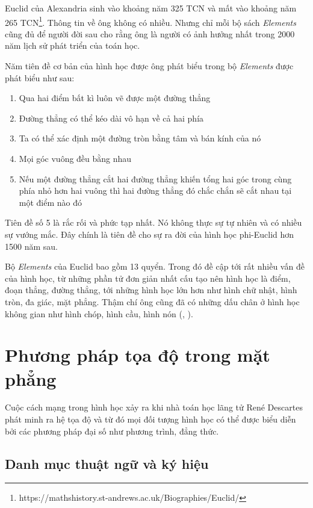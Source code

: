 Euclid của Alexandria sinh vào khoảng năm 325 TCN và mất vào khoảng năm 265 TCN\footnote{https://mathshistory.st-andrews.ac.uk/Biographies/Euclid/}. Thông tin về ông không có nhiều. Nhưng chỉ mỗi bộ sách \textit{Elements} cũng đủ để người đời sau cho rằng ông là người có ảnh hưởng nhất trong 2000 năm lịch sử phát triển của toán học.

Năm tiên đề cơ bản của hình học được ông phát biểu trong bộ \textit{Elements} được phát biểu như sau:

\begin{enumerate}
	\item Qua hai điểm bất kì luôn vẽ được một đường thẳng
	\item Đường thẳng có thể kéo dài vô hạn về cả hai phía
	\item Ta có thể xác định một đường tròn bằng tâm và bán kính của nó
	\item Mọi góc vuông đều bằng nhau
	\item Nếu một đường thẳng cắt hai đường thẳng khiến tổng hai góc trong cùng phía nhỏ hơn hai vuông thì hai đường thẳng đó chắc chắn sẽ cắt nhau tại một điểm nào đó
\end{enumerate}

Tiên đề số 5 là rắc rối và phức tạp nhất. Nó không thực sự tự nhiên và có nhiều sự vướng mắc. Đây chính là tiên đề cho sự ra đời của hình học phi-Euclid hơn 1500 năm sau.

Bộ \textit{Elements} của Euclid bao gồm 13 quyển. Trong đó đề cập tới rất nhiều vấn đề của hình học, từ những phần tử đơn giản nhất cấu tạo nên hình học là điểm, đoạn thẳng, đường thẳng, tới những hình học lớn hơn như hình chữ nhật, hình tròn, đa giác, mặt phẳng. Thậm chí ông cũng đã có những dấu chân ở hình học không gian như hình chóp, hình cầu, hình nón (\cite{Euclid}, \cite{Casey2007}).

\section{Phương pháp tọa độ trong mặt phẳng}

Cuộc cách mạng trong hình học xảy ra khi nhà toán học lãng tử René Descartes phát minh ra hệ tọa độ và từ đó mọi đối tượng hình học có thể được biểu diễn bởi các phương pháp đại số như phương trình, đẳng thức.

\subsection*{Danh mục thuật ngữ và ký hiệu}

